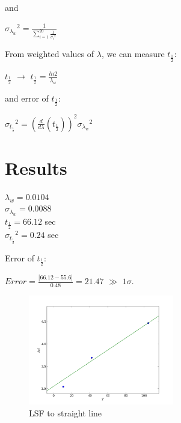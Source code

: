 \documentclass[aps,twocolumn,secnumarabic,nobalancelastpage,amsmath,amssymb,
nofootinbib]{revtex4}
\begin{document}
and 

\begin{center}
${ { \sigma  }_{ { \lambda  }_{ w } } }^{ 2 }=\frac { 1 }{ \sum _{ i=1 }^{ 20 }{ \frac { 1 }{ { { \sigma  }_{ i } }^{ 2 } }  }  } $
\end{center}

From weighted values of $\lambda$, we can measure ${t}_{\frac{1}{2}}$:

\begin{center}
${t}_{\frac{1}{2}}$ $\longrightarrow$ ${t}_{\frac{1}{2}}=\frac{ln2}{{\lambda}_{w}}$
\end{center}

and error of ${t}_{\frac{1}{2}}$:

\begin{center}
${ { \sigma  }_{ { t }_{ \frac { 1 }{ 2 }  } } }^{ 2 }={ \left( \frac { d }{ d\lambda  } \left( { t }_{ \frac { 1 }{ 2 }  } \right)  \right)  }^{ 2 }{ { \sigma  }_{ { \lambda  }_{ w } } }^{ 2 }$
\end{center}

\section{Results}

\begin{center}
$\lambda_{w}=0.0104$\\
${\sigma}_{{\lambda}_{w}}=0.0088$\\
${t}_{\frac{1}{2}}=66.12 $ sec\\
${{\sigma}_{{t}_{\frac{1}{2}}}}^{2}=0.24$ sec \\

\end{center}

Error of ${t}_{\frac{1}{2}}$:

\begin{center}
$Error=\frac{|66.12-55.6|}{0.48}=21.47$ $\gg$ $1\sigma$.
\end{center}



\begin{figure}[htbp]
\includegraphics[width=2.5in]{plot1}
\caption{LSF to straight line}
\label{fig:schematic}
\end{figure}
\end{document}
